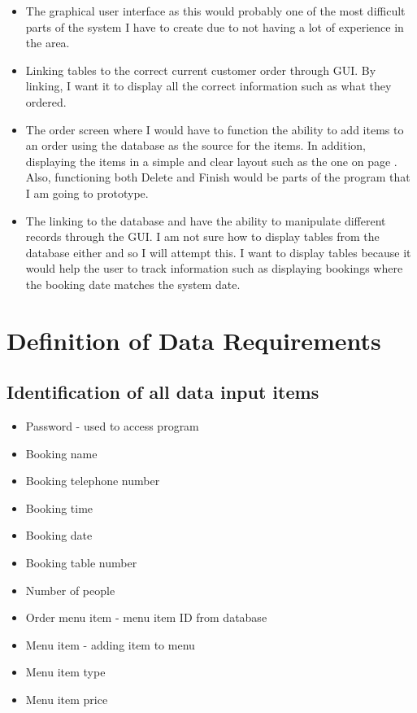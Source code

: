 \begin{itemize}

	\item The graphical user interface as this would probably one of the most difficult parts of the system I have to create due to not having a lot of experience in the area.
	\item Linking tables to the correct current customer order through GUI. By linking, I want it to display all the correct information such as what they ordered.
	\item The order screen where I would have to function the ability to add items to an order using the database as the source for the items. In addition, displaying the items in a simple 	and clear layout such as the one on page \pageref{fig:Add}. Also, functioning both Delete and Finish would be parts of the program that I am going to prototype.
	\item The linking to the database and have the ability to manipulate different records through the GUI. I am not sure how to display tables from the database either and so I will   			attempt this. I want to display tables because it would help the user to track information such as displaying bookings where the booking date matches the system date.

\end{itemize}


\section{Definition of Data Requirements}

\subsection{Identification of all data input items}

\begin{itemize}
	\item Password - used to access program
	\item Booking name
	\item Booking telephone number
	\item Booking time
	\item Booking date
	\item Booking table number
	\item Number of people
	\item Order menu item - menu item ID from database
	\item Menu item - adding item to menu
	\item Menu item type
	\item Menu item price
	

\end {itemize}

